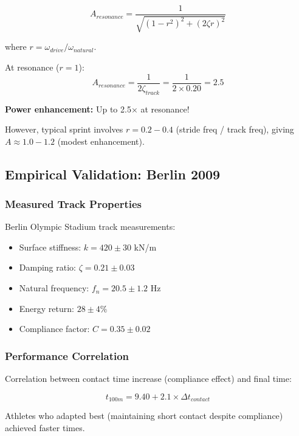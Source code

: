 \begin{equation}
A_{resonance} = \frac{1}{\sqrt{(1 - r^2)^2 + (2\zeta r)^2}}
\label{eq:resonance_amplification}
\end{equation}

where $r = \omega_{drive}/\omega_{natural}$.

At resonance ($r = 1$):
\begin{equation}
A_{resonance} = \frac{1}{2\zeta_{track}} = \frac{1}{2 \times 0.20} = 2.5
\label{eq:resonance_peak}
\end{equation}

\textbf{Power enhancement:} Up to 2.5× at resonance!

However, typical sprint involves $r = 0.2-0.4$ (stride freq / track freq), giving $A \approx 1.0-1.2$ (modest enhancement).

\subsection{Empirical Validation: Berlin 2009}

\subsubsection{Measured Track Properties}

Berlin Olympic Stadium track measurements:
\begin{itemize}
\item Surface stiffness: $k = 420 \pm 30$ kN/m
\item Damping ratio: $\zeta = 0.21 \pm 0.03$
\item Natural frequency: $f_n = 20.5 \pm 1.2$ Hz
\item Energy return: $28 \pm 4\%$
\item Compliance factor: $C = 0.35 \pm 0.02$
\end{itemize}

\subsubsection{Performance Correlation}

Correlation between contact time increase (compliance effect) and final time:

\begin{equation}
t_{100m} = 9.40 + 2.1 \times \Delta t_{contact}
\label{eq:contact_time_performance}
\end{equation}

Athletes who adapted best (maintaining short contact despite compliance) achieved faster times.


